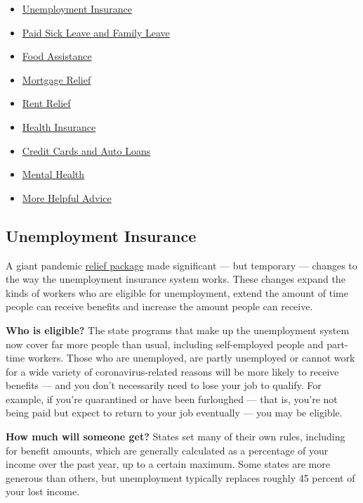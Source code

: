 \begin{itemize}
\tightlist
\item
  \protect\hyperlink{link-2f8736c0}{Unemployment Insurance}
\item
  \protect\hyperlink{link-4ccc30a7}{Paid Sick Leave and Family Leave}
\item
  \protect\hyperlink{link-3c2140bc}{Food Assistance}
\item
  \protect\hyperlink{link-39bfe27a}{Mortgage Relief}
\item
  \protect\hyperlink{link-1da1a7c4}{Rent Relief}
\item
  \protect\hyperlink{link-74e96196}{Health Insurance}
\item
  \protect\hyperlink{link-75bcf9dc}{Credit Cards and Auto Loans}
\item
  \protect\hyperlink{link-49737032}{Mental Health}
\item
  \protect\hyperlink{link-16f012f2}{More Helpful Advice}
\end{itemize}

\hypertarget{unemployment-insurance}{%
\subsection{Unemployment Insurance}\label{unemployment-insurance}}

A giant pandemic
\href{https://www.nytimes3xbfgragh.onion/2020/03/27/world/coronavirus-live-news-updates.html\#link-1900f91a}{relief
package} made significant --- but temporary --- changes to the way the
unemployment insurance system works. These changes expand the kinds of
workers who are eligible for unemployment, extend the amount of time
people can receive benefits and increase the amount people can receive.

\textbf{Who is eligible?} The state programs that make up the
unemployment system now cover far more people than usual, including
self-employed people and part-time workers. Those who are unemployed,
are partly unemployed or cannot work for a wide variety of
coronavirus-related reasons will be more likely to receive benefits ---
and you don't necessarily need to lose your job to qualify. For example,
if you're quarantined or have been furloughed --- that is, you're not
being paid but expect to return to your job eventually --- you may be
eligible.

\textbf{How much will someone get?} States set many of their own rules,
including for benefit amounts, which are generally calculated as a
percentage of your income over the past year, up to a certain maximum.
Some states are more generous than others, but unemployment typically
replaces roughly 45 percent of your lost income.

